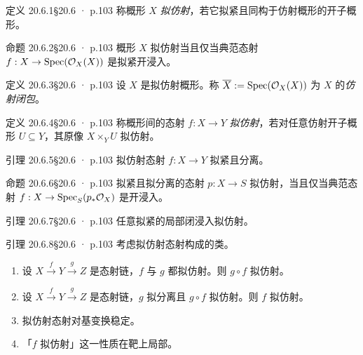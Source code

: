 \documentclass[UTF8,10pt,fontset=windows]{ctexart}
\newcommand{\Spec}{\operatorname{Spec}}\newcommand{\Spm}{\operatorname{Spm}}
\begin{document}
\begin{card}{定义 20.6.1}{§20.6 · p.103}
称概形 $X$ \emph{拟仿射}，若它拟紧且同构于仿射概形的开子概形。
\end{card}
\begin{card}{命题 20.6.2}{§20.6 · p.103}
概形 $X$ 拟仿射当且仅当典范态射 $f:X\to\Spec(\cO_X(X))$ 是拟紧开浸入。
\end{card}
\begin{card}{定义 20.6.3}{§20.6 · p.103}
设 $X$ 是拟仿射概形。称 $\overline{X}:=\Spec(\cO_X(X))$ 为 $X$ 的\emph{仿射闭包}。
\end{card}
\begin{card}{定义 20.6.4}{§20.6 · p.103}
称概形间的态射 $f:X\to Y$ \emph{拟仿射}，若对任意仿射开子概形 $U\subseteq Y$，其原像 $X\times_Y U$ 拟仿射。
\end{card}
\begin{card}{引理 20.6.5}{§20.6 · p.103}
拟仿射态射 $f:X\to Y$ 拟紧且分离。
\end{card}
\begin{card}{命题 20.6.6}{§20.6 · p.103}
拟紧且拟分离的态射 $p:X\to S$ 拟仿射，当且仅当典范态射 $f:X\to\Spec_S(p_*\cO_X)$ 是开浸入。
\end{card}
\begin{card}{引理 20.6.7}{§20.6 · p.103}
任意拟紧的局部闭浸入拟仿射。
\end{card}
\begin{card}{引理 20.6.8}{§20.6 · p.103}
考虑拟仿射态射构成的类。
\begin{enumerate}[label=(\roman*),leftmargin=2em,itemsep=0.25ex]
  \item 设 $X\xrightarrow{f}Y\xrightarrow{g}Z$ 是态射链，$f$ 与 $g$ 都拟仿射。则 $g\circ f$ 拟仿射。
  \item 设 $X\xrightarrow{f}Y\xrightarrow{g}Z$ 是态射链，$g$ 拟分离且 $g\circ f$ 拟仿射。则 $f$ 拟仿射。
  \item 拟仿射态射对基变换稳定。
  \item 「$f$ 拟仿射」这一性质在靶上局部。
\end{enumerate}
\end{card}
\end{document}
